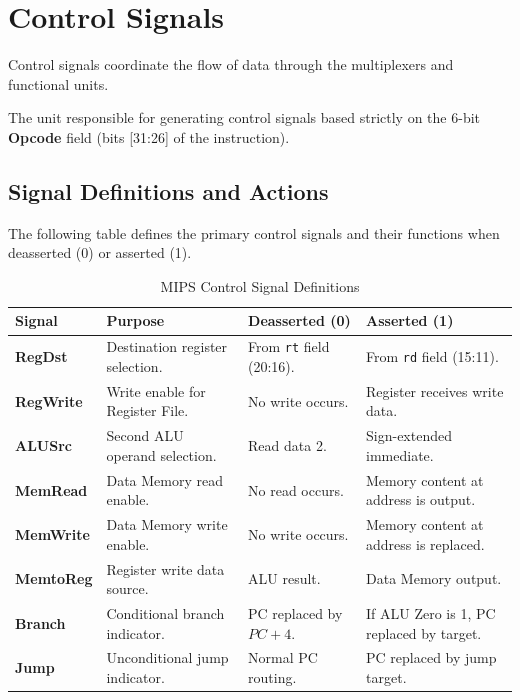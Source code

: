 \section{Control Signals}

Control signals coordinate the flow of data through the multiplexers and functional units.

\begin{definition}
The unit responsible for generating control signals based strictly on the 6-bit \textbf{Opcode} field (bits [31:26] of the instruction).
\end{definition}

\subsection{Signal Definitions and Actions}

The following table defines the primary control signals and their functions when deasserted (0) or asserted (1).

\begin{table}[h]
\centering
\begin{tabular}{l p{4cm} p{4cm} p{4cm}}
\toprule
\textbf{Signal} & \textbf{Purpose} & \textbf{Deasserted (0)} & \textbf{Asserted (1)} \\
\midrule
\textbf{RegDst} & Destination register selection. & From \texttt{rt} field (20:16). & From \texttt{rd} field (15:11). \\
\textbf{RegWrite} & Write enable for Register File. & No write occurs. & Register receives write data. \\
\textbf{ALUSrc} & Second ALU operand selection. & Read data 2. & Sign-extended immediate. \\
\textbf{MemRead} & Data Memory read enable. & No read occurs. & Memory content at address is output. \\
\textbf{MemWrite} & Data Memory write enable. & No write occurs. & Memory content at address is replaced. \\
\textbf{MemtoReg} & Register write data source. & ALU result. & Data Memory output. \\
\textbf{Branch} & Conditional branch indicator. & PC replaced by $PC + 4$. & If ALU Zero is 1, PC replaced by target. \\
\textbf{Jump} & Unconditional jump indicator. & Normal PC routing. & PC replaced by jump target. \\
\bottomrule
\end{tabular}
\caption{MIPS Control Signal Definitions}
\end{table}

